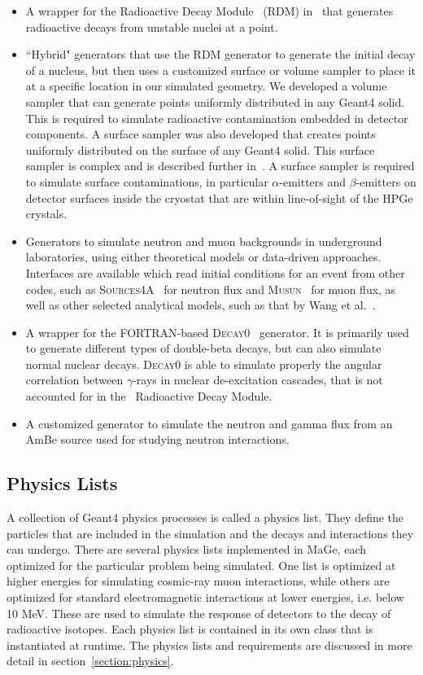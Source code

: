 \documentclass[article]{IEEEtran}
\begin{document}
\begin{itemize}
\item A wrapper for the Radioactive Decay Module~\cite{G4RDM} 
(RDM) in \GF\ that generates radioactive decays from unstable nuclei at a point.
\item ``Hybrid" generators that use the RDM generator to generate the initial decay of a nucleus, but then uses a customized surface or volume sampler to place it at a specific location in our simulated geometry. We developed a volume sampler that can generate points uniformly distributed in any {\sc
Geant4} solid. This is required to
simulate radioactive contamination embedded in detector components. A
surface sampler was also developed that creates points uniformly
distributed on the surface of any {\sc Geant4} solid. 
This surface sampler is complex and is described further in~\cite{surfacesampler}. 
A surface sampler is required to simulate surface contaminations, in particular $\alpha$-emitters and $\beta$-emitters on detector surfaces inside the cryostat that are within line-of-sight of the HPGe crystals.
\item Generators to simulate neutron and
muon backgrounds in underground laboratories, using either theoretical
models or data-driven approaches. Interfaces are available which read
initial conditions for an event from other codes, such as
\textsc{Sources4A}~\cite{sources4a} for neutron flux and
\textsc{Musun}~\cite{musun} for muon flux, as well as other selected analytical models, such as that by Wang et al.~\cite{wang}. 
\item A wrapper for the FORTRAN-based \textsc{Decay0}~\cite{decay0} generator. It is primarily used to generate 
different types of double-beta decays, but can also simulate normal nuclear decays. \textsc{Decay0} is able to 
simulate properly the angular correlation between $\gamma$-rays in nuclear de-excitation cascades, that is not accounted for  
in the \GF\ Radioactive Decay Module.
\item A customized generator to simulate the neutron and gamma flux from an AmBe source used for studying neutron interactions. 
\end{itemize}


\subsection{Physics Lists}
\label{se:physics_lists}
A collection of {\sc Geant4} physics
processes is called a physics list. They define the particles that are
included in the simulation and the decays and interactions they can
undergo.  There are several physics lists implemented in {\sc MaGe},
each optimized for the particular problem being simulated.  One list
is optimized at higher energies for simulating cosmic-ray muon
interactions, while others are optimized for standard electromagnetic
interactions at lower energies, i.e. below 10 MeV. These are used to
simulate the response of detectors to the decay of radioactive
isotopes. Each physics list is contained in its own class that is
instantiated at runtime. The physics lists and requirements are discussed in more detail in section~\ref{section:physics}.
 
\end{document}
